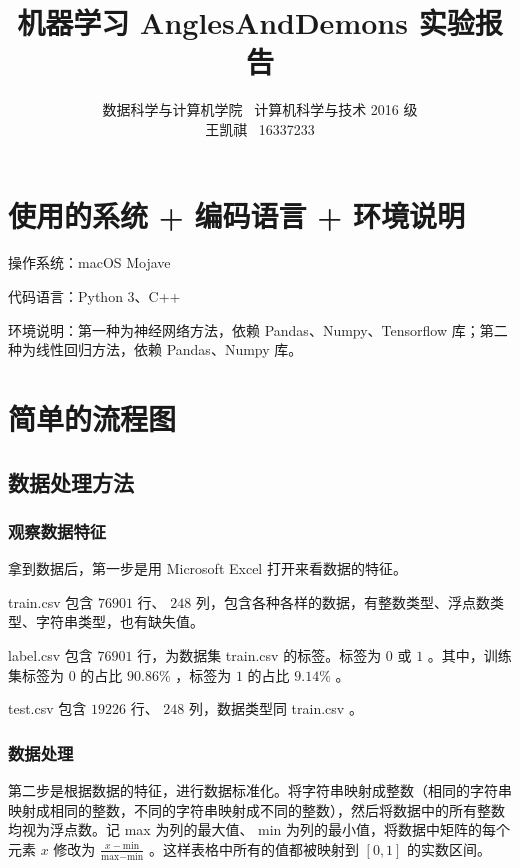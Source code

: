 \documentclass{article}
\begin{document}
\title{机器学习 AnglesAndDemons 实验报告}
\author {数据科学与计算机学院 \ 计算机科学与技术 2016 级 \\ 王凯祺 \ 16337233}
\maketitle

\section{使用的系统 + 编码语言 + 环境说明}

操作系统：macOS Mojave

代码语言：Python 3、C++

环境说明：第一种为神经网络方法，依赖 Pandas、Numpy、Tensorflow 库；第二种为线性回归方法，依赖 Pandas、Numpy 库。

\section{简单的流程图}

\subsection{数据处理方法}

\subsubsection{观察数据特征}

拿到数据后，第一步是用 Microsoft Excel 打开来看数据的特征。

train.csv 包含 $76901$ 行、 $248$ 列，包含各种各样的数据，有整数类型、浮点数类型、字符串类型，也有缺失值。

label.csv 包含 $76901$ 行，为数据集 train.csv 的标签。标签为 $0$ 或 $1$ 。其中，训练集标签为 $0$ 的占比 $90.86\%$ ，标签为 $1$ 的占比 $9.14\%$ 。

test.csv 包含 $19226$ 行、 $248$ 列，数据类型同 train.csv 。

\subsubsection{数据处理}

第二步是根据数据的特征，进行数据标准化。将字符串映射成整数（相同的字符串映射成相同的整数，不同的字符串映射成不同的整数），然后将数据中的所有整数均视为浮点数。记 max 为列的最大值、 min 为列的最小值，将数据中矩阵的每个元素 $x$ 修改为 $\frac{x - \text{min}}{\text{max} - \text{min}}$ 。这样表格中所有的值都被映射到 $[0, 1]$ 的实数区间。
\end{document}
